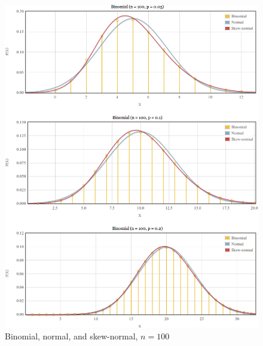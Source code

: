 \documentclass{article}
\begin{document}
\begin{figure}
  \centering
  \includegraphics[width=\textwidth]{../images/comparison-n100.png}
  \caption{Binomial, normal, and skew-normal, $n=100$}
  \label{fig:comparison-n100}
\end{figure}
\end{document}
